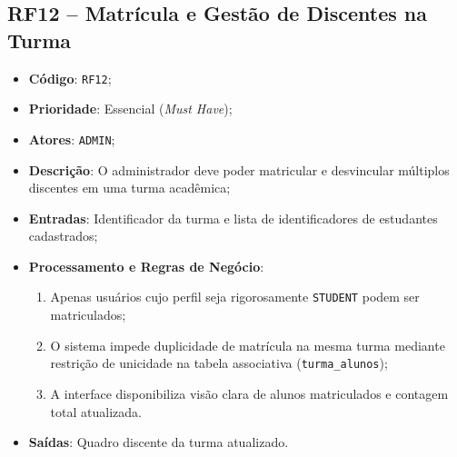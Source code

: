 \subsection{RF12 -- Matrícula e Gestão de Discentes na Turma}
\begin{itemize}
    \item \textbf{Código}: \texttt{RF12};
    \item \textbf{Prioridade}: Essencial (\textit{Must Have});
    \item \textbf{Atores}: \texttt{ADMIN};
    \item \textbf{Descrição}: O administrador deve poder matricular e desvincular múltiplos discentes em uma turma acadêmica;
    \item \textbf{Entradas}: Identificador da turma e lista de identificadores de estudantes cadastrados;
    \item \textbf{Processamento e Regras de Negócio}:
    \begin{enumerate}
        \item Apenas usuários cujo perfil seja rigorosamente \texttt{STUDENT} podem ser matriculados;
        \item O sistema impede duplicidade de matrícula na mesma turma mediante restrição de unicidade na tabela associativa (\texttt{turma\_alunos});
        \item A interface disponibiliza visão clara de alunos matriculados e contagem total atualizada.
    \end{enumerate}
    \item \textbf{Saídas}: Quadro discente da turma atualizado.
\end{itemize}

